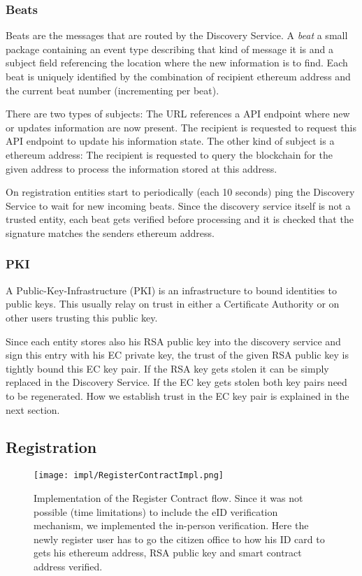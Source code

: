 \subsubsection{Beats}
\label{sec:beats}
Beats are the messages that are routed by the Discovery Service. A \textit{beat} a small package containing an event type describing that kind of message it is and a subject field referencing the location where the new information is to find. Each beat is uniquely identified by the combination of recipient ethereum address and the current beat number (incrementing per beat). 

There are two types of subjects: The URL references a API endpoint where new or updates information are now present. The recipient is requested to request this API endpoint to update his information state. The other kind of subject is a ethereum address: The recipient is requested to query the blockchain for the given address to process the information stored at this address. 

On registration entities start to periodically (each 10 seconds) ping the Discovery Service to wait for new incoming beats. Since the discovery service itself is not a trusted entity, each beat gets verified before processing and it is checked that the signature matches the senders ethereum address.

\subsubsection{PKI}
\label{sec:pki}

A Public-Key-Infrastructure (PKI) is an infrastructure to bound identities to public keys. This usually relay on trust in either a Certificate Authority or on other users trusting this public key. 

Since each entity stores also his RSA public key into the discovery service and sign this entry with his EC private key, the trust of the given RSA public key is tightly bound this EC key pair. If the RSA key gets stolen it can be simply replaced in the Discovery Service. If the EC key gets stolen both key pairs need to be regenerated. How we establish trust in the EC key pair is explained in the next section.

\subsection{Registration}
\label{sec:registerContract}
\begin{figure}
\texttt{[image: impl/RegisterContractImpl.png]}
\centering
\caption{Implementation of the Register Contract flow. Since it was not possible (time limitations) to include the eID verification mechanism, we implemented the in-person verification. Here the newly register user has to go the citizen office to how his ID card to gets his ethereum address, RSA public key and smart contract address verified.}
\label{fig:registerContractImpl}
\end{figure}

